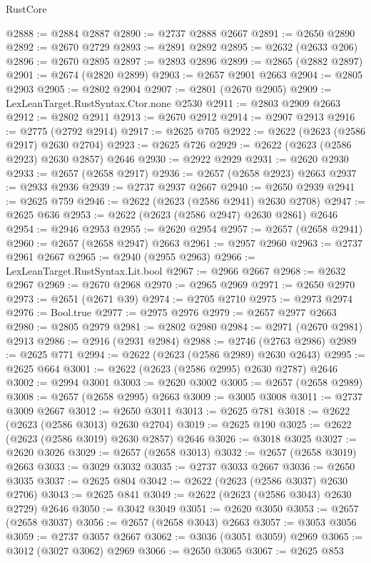 \begin{lexlean}{RustCore}
\begin{coremodule}
@2888 := @2884 @2887
@2890 := @2737 @2888 @2667
@2891 := @2650 @2890
@2892 := @2670 @2729
@2893 := @2891 @2892
@2895 := @2632 (@2633 @206)
@2896 := @2670 @2895
@2897 := @2893 @2896
@2899 := @2865 (@2882 @2897)
@2901 := @2674 (@2820 @2899)
@2903 := @2657 @2901 @2663
@2904 := @2805 @2903
@2905 := @2802 @2904
@2907 := @2801 (@2670 @2905)
@2909 := LexLeanTarget.RustSyntax.Ctor.none @2530
@2911 := @2803 @2909 @2663
@2912 := @2802 @2911
@2913 := @2670 @2912
@2914 := @2907 @2913
@2916 := @2775 (@2792 @2914)
@2917 := @2625 @705
@2922 := @2622 (@2623 (@2586 @2917) @2630 @2704)
@2923 := @2625 @726
@2929 := @2622 (@2623 (@2586 @2923) @2630 @2857) @2646
@2930 := @2922 @2929
@2931 := @2620 @2930
@2933 := @2657 (@2658 @2917)
@2936 := @2657 (@2658 @2923) @2663
@2937 := @2933 @2936
@2939 := @2737 @2937 @2667
@2940 := @2650 @2939
@2941 := @2625 @759
@2946 := @2622 (@2623 (@2586 @2941) @2630 @2708)
@2947 := @2625 @636
@2953 := @2622 (@2623 (@2586 @2947) @2630 @2861) @2646
@2954 := @2946 @2953
@2955 := @2620 @2954
@2957 := @2657 (@2658 @2941)
@2960 := @2657 (@2658 @2947) @2663
@2961 := @2957 @2960
@2963 := @2737 @2961 @2667
@2965 := @2940 (@2955 @2963)
@2966 := LexLeanTarget.RustSyntax.Lit.bool
@2967 := @2966 @2667
@2968 := @2632 @2967
@2969 := @2670 @2968
@2970 := @2965 @2969
@2971 := @2650 @2970
@2973 := @2651 (@2671 @39)
@2974 := @2705 @2710
@2975 := @2973 @2974
@2976 := Bool.true
@2977 := @2975 @2976
@2979 := @2657 @2977 @2663
@2980 := @2805 @2979
@2981 := @2802 @2980
@2984 := @2971 (@2670 @2981) @2913
@2986 := @2916 (@2931 @2984)
@2988 := @2746 (@2763 @2986)
@2989 := @2625 @771
@2994 := @2622 (@2623 (@2586 @2989) @2630 @2643)
@2995 := @2625 @664
@3001 := @2622 (@2623 (@2586 @2995) @2630 @2787) @2646
@3002 := @2994 @3001
@3003 := @2620 @3002
@3005 := @2657 (@2658 @2989)
@3008 := @2657 (@2658 @2995) @2663
@3009 := @3005 @3008
@3011 := @2737 @3009 @2667
@3012 := @2650 @3011
@3013 := @2625 @781
@3018 := @2622 (@2623 (@2586 @3013) @2630 @2704)
@3019 := @2625 @190
@3025 := @2622 (@2623 (@2586 @3019) @2630 @2857) @2646
@3026 := @3018 @3025
@3027 := @2620 @3026
@3029 := @2657 (@2658 @3013)
@3032 := @2657 (@2658 @3019) @2663
@3033 := @3029 @3032
@3035 := @2737 @3033 @2667
@3036 := @2650 @3035
@3037 := @2625 @804
@3042 := @2622 (@2623 (@2586 @3037) @2630 @2706)
@3043 := @2625 @841
@3049 := @2622 (@2623 (@2586 @3043) @2630 @2729) @2646
@3050 := @3042 @3049
@3051 := @2620 @3050
@3053 := @2657 (@2658 @3037)
@3056 := @2657 (@2658 @3043) @2663
@3057 := @3053 @3056
@3059 := @2737 @3057 @2667
@3062 := @3036 (@3051 @3059) @2969
@3065 := @3012 (@3027 @3062) @2969
@3066 := @2650 @3065
@3067 := @2625 @853

\end{coremodule}
\end{lexlean}
